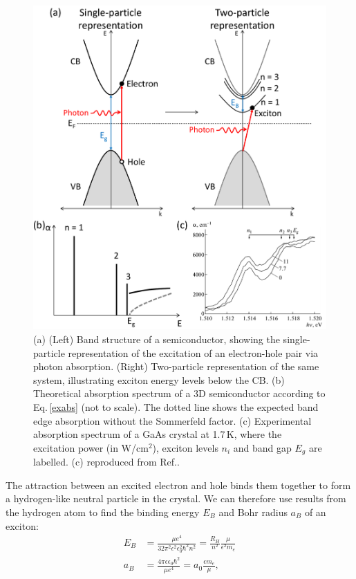 \begin{figure}[h!] 
\centering    
\includegraphics[width=\textwidth]{Fig1}
\caption{(a) (Left) Band structure of a semiconductor, showing the single-particle representation of the excitation of an electron-hole pair via photon absorption. (Right) Two-particle representation of the same system, illustrating exciton energy levels below the CB. (b) Theoretical absorption spectrum of a 3D semiconductor according to Eq.\,\ref{exabs} (not to scale). The dotted line shows the expected band edge absorption without the Sommerfeld factor. (c) Experimental absorption spectrum of a GaAs crystal at 1.7\,K, where the excitation power (in W/cm$^2$), exciton levels $n_i$ and band gap $E_g$ are labelled. (c) reproduced from Ref.\!.}
\label{2Fig1}
\end{figure}
The attraction between an excited electron and hole binds them together to form a hydrogen-like neutral particle in the crystal. We can therefore use results from the hydrogen atom to find the binding energy $E_B$ and Bohr radius $a_B$ of an exciton:
\begin{subequations}
\label{ex3D}
\begin{align}
E_B &=\frac{\mu e^4}{32\pi^2\epsilon^2\epsilon_0^2\hbar^2n^2} = \frac{R_H}{n^2}\frac{\mu}{\epsilon^2 m_e} \label{exbinding3D}\\
a_B &= \frac{4\pi\epsilon\epsilon_0\hbar^2}{\mu e^4}=a_0\frac{\epsilon m_e}{\mu} \label{exrad3D},
\end{align}
\end{subequations}
